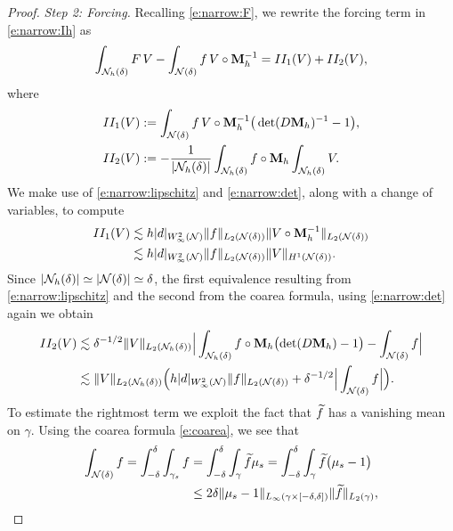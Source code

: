 \begin{proof}
%
\noindent  
{\it Step 2: Forcing.}
Recalling \eqref{e:narrow:F}, we rewrite the forcing term in \eqref{e:narrow:Ih} as 
%
\begin{align*}
\int_{\mathcal{N}_h(\delta)} F \, V - \int_{\mathcal{N}(\delta)} f \, V\circ{\bf M}_h^{-1} = II_1(V) + II_2(V),
\end{align*}
%
where
%
\begin{align*}
II_1(V) & := \int_{\mathcal{N}(\delta)} f\, V \circ {\bf M}_h^{-1} \big(\det(D {\bf M}_h)^{-1}-1 \big), 
\\  
II_2(V) & := -\frac{1}{|\mathcal{N}_h(\delta)|} \int_{\mathcal{N}_h(\delta)}  f \circ {\bf M}_h \int_{\mathcal{N}_h(\delta)} V. 
\end{align*}
%
We make use of \eqref{e:narrow:lipschitz} and \eqref{e:narrow:det}, along with a change of variables, to compute
%
$$\begin{aligned}
II_1(V) &  \lesssim h|d|_{W_\infty^2(\mathcal{N})} \|f\|_{L_2({\mathcal{N}(\delta)})} \|V \circ {\bf M}_h^{-1} \|_{L_2({\mathcal{N}(\delta)})}
  \\ & \lesssim h|d|_{W_\infty^2(\mathcal{N})} \|f\|_{L_2({\mathcal{N}(\delta)})} \|V\|_{H^1({\mathcal{N}(\delta)})}.
  \end{aligned}
  $$
%
Since $|\mathcal{N}_h(\delta)| \simeq |{\mathcal{N}(\delta)}| \simeq \delta$, the first equivalence resulting from \eqref{e:narrow:lipschitz} and the second from the coarea formula, using \eqref{e:narrow:det} again we obtain
  $$
  \begin{aligned}
  II_2(V ) &\lesssim \delta^{-1/2} \|V\|_{L_2(\mathcal{N}_h(\delta))} \Big | \int_{\mathcal{N}_h(\delta)} f \circ {\bf M}_h \big({\rm det} (D{\bf M}_h)-1 \big) - \int_{{\mathcal{N}(\delta)}} f \Big | 
  \\ & \lesssim \|V\|_{L_2(\mathcal{N}_h(\delta))} \Big ( h|d|_{W_\infty^2(\mathcal{N})} \|f\|_{L_2({\mathcal{N}(\delta)})} + \delta^{-1/2}\Big |\int_{{\mathcal{N}(\delta)}} f \Big| \Big) .
  \end{aligned}
  $$
To estimate the rightmost term we exploit the fact that $\widetilde{f}$ has a vanishing
mean on $\gamma$. Using the coarea formula \eqref{e:coarea}, we see that
%
\[\begin{aligned}
\int_\Nd f = \int_{-\delta}^\delta \int_{\gamma_s} f &= \int_{-\delta}^\delta \int_\gamma \wf
\mu_s = \int_{-\delta}^\delta \int_\gamma \wf \big(\mu_s - 1  \big) 
\\ & \le 2 \delta \|\mu_s-1\|_{L_\infty(\gamma \times [-\delta, \delta])} \|\wf\|_{L_2(\gamma)},

\end{aligned}\]
\end{proof}
